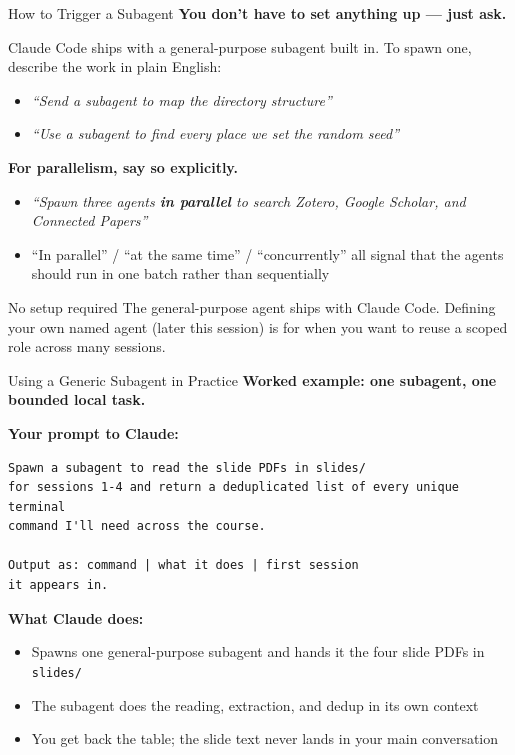 \documentclass[aspectratio=169, 11pt]{beamer}
\begin{document}
\begin{frame}{How to Trigger a Subagent}
  \textbf{You don't have to set anything up --- just ask.}

  \vspace{0.6em}
  Claude Code ships with a general-purpose subagent built in. To spawn one, describe the work in plain English:
  \begin{itemize}
    \item \textit{``Send a subagent to map the directory structure''}
    \item \textit{``Use a subagent to find every place we set the random seed''}
  \end{itemize}

  \vspace{0.6em}
  \textbf{For parallelism, say so explicitly.}
  \begin{itemize}
    \item \textit{``Spawn three agents \textbf{in parallel} to search Zotero, Google Scholar, and Connected Papers''}
    \item ``In parallel'' / ``at the same time'' / ``concurrently'' all signal that the agents should run in one batch rather than sequentially
  \end{itemize}

  \vspace{0.6em}
  \begin{block}{No setup required}
    The general-purpose agent ships with Claude Code. Defining your own named agent (later this session) is for when you want to reuse a scoped role across many sessions.
  \end{block}
\end{frame}

\begin{frame}[fragile]{Using a Generic Subagent in Practice}
  \textbf{Worked example: one subagent, one bounded local task.}

  \vspace{0.3em}
  \textbf{Your prompt to Claude:}
  \begin{lstlisting}[basicstyle=\ttfamily\scriptsize]
Spawn a subagent to read the slide PDFs in slides/
for sessions 1-4 and return a deduplicated list of every unique terminal
command I'll need across the course.

Output as: command | what it does | first session
it appears in.
  \end{lstlisting}

  \vspace{0.2em}
  \textbf{What Claude does:}
  \begin{itemize}\small
    \item Spawns one general-purpose subagent and hands it the four slide PDFs in \texttt{slides/}
    \item The subagent does the reading, extraction, and dedup in its own context
    \item You get back the table; the slide text never lands in your main conversation
  \end{itemize}

  \vspace{0.2em}
\end{frame}
\end{document}
